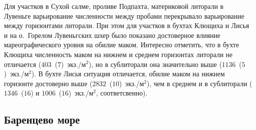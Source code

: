 \documentclass[12pt, a4paper]{disser}
\begin{document}
%
Для участков в Сухой салме, проливе Подпахта, материковой литорали в Лувеньге варьирование численности между пробами перекрывало варьирование между горизонтами литорали.
При этом для участков в бухтах Клющиха и Лисья и на о.~Горелом Лувеньгских шхер  было показано достоверное влияние мареографического уровня на обилие маком. 
Интересно отметить, что в бухте Клющиха численность маком на нижнем и среднем горизонтах литорали не отличается ($403$~($7$)~экз./м$^2$), но в сублиторали она значительно выше ($1136$~($5$)~экз./м$^2$).
В бухте Лисья ситуация отличается, обилие маком на нижнем горизонте достоверно выше ($2832$~($10$)~экз./м$^2$), чем в среднем и в сублиторали ($1346$~($16$) и $1006$~($16$)~экз./м$^2$, соответсвенно). 



	\subsection{Баренцево море}
\end{document}
